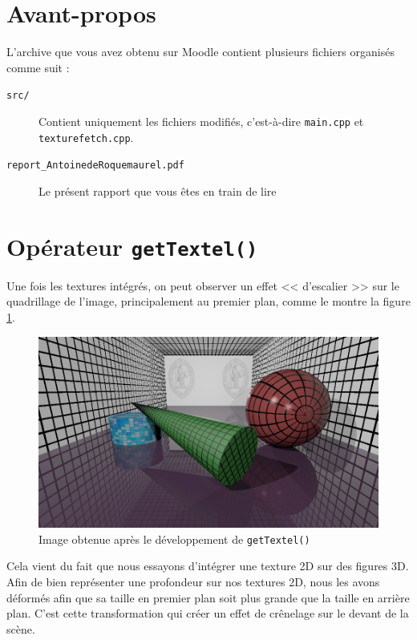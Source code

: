 \documentclass[a4paper, 11pt]{article}
\begin{document}
	\maketitle
	\section{Avant-propos}
	L'archive que vous avez obtenu sur Moodle contient plusieurs fichiers organisés comme suit : 
	\begin{description}
		\item[\texttt{src/}] Contient uniquement les fichiers modifiés, c'est-à-dire \texttt{main.cpp} et \texttt{texturefetch.cpp}.
		\item[\texttt{report\_AntoinedeRoquemaurel.pdf}] Le présent rapport que vous êtes en train de lire
	\end{description}

	\section{Opérateur \texttt{getTextel()}}
	Une fois les textures intégrés, on peut observer un effet << d'escalier >> sur le quadrillage de l'image, principalement au premier plan, comme le montre la
	figure \ref{fig:fig1}. 

	\begin{figure}[H]
		\centering
		\includegraphics[width=12cm]{1-monimage.png}
		\caption{Image obtenue après le développement de \texttt{getTextel()}}
		\label{fig:fig1}
	\end{figure}
	Cela vient du fait que nous essayons d'intégrer une texture 2D sur des figures 3D. Afin de bien représenter une profondeur sur nos textures 2D, nous les
	avons déformés afin que sa taille en premier plan soit plus grande que la taille en arrière plan. C'est cette transformation qui créer un effet de crênelage
	sur le devant de la scène.
\end{document}
